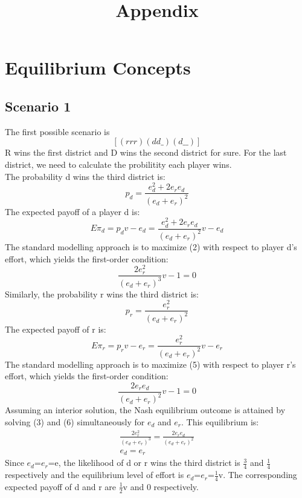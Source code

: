 \documentclass[a4paper,12pt]{article}
\author{}
\title{Appendix}
\date{} %
\begin{document}
\maketitle

\section{Equilibrium Concepts}

\subsection{Scenario 1}

The first possible scenario is $$[(rrr)(dd\_)(d\_\_)]$$
R wins the first district and D wins the second district for sure. For the last district, we need to calculate the probilitity each player wins.
\\The probability d wins the third district is: 
\begin{equation}
p_d = \frac{e_d^2+2e_re_d}{(e_d+e_r)^2}
\end{equation}
The expected payoff of a player d is:
\begin{equation}
E\pi_d= p_dv-e_d = \frac{e_d^2+2e_re_d}{(e_d+e_r)^2} v-e_d
\end{equation}
The standard modelling approach is to maximize (2) with respect to player d's effort, which yields the first-order condition: 
\begin{equation}
\frac{2e_r^2}{(e_d+e_r)^3}v-1=0
\end{equation}
Similarly, the probability r wins the third district is:
\begin{equation} 
p_r =\frac{e_r^2}{(e_d+e_r)^2}
\end{equation}
The expected payoff of r is: 
\begin{equation} 
E\pi_r= p_rv-e_r= \frac{e_r^2}{(e_d+e_r)^2} v-e_r
\end{equation}
The standard modelling approach is to maximize (5) with respect to player r's effort, which yields the first-order condition: 
\begin{equation} 
\frac{2e_re_d}{(e_d+e_r)^2}v-1=0
\end{equation}
Assuming an interior solution, the Nash equilibrium outcome is attained by solving (3) and (6) simultaneously for $e_d$ and $e_r$. This equilibrium is: 
\begin{eqnarray} 
\frac{2e_r^2}{(e_d+e_r)^3} = \frac{2e_re_d}{(e_d+e_r)^2} \\
e_d=e_r
\end{eqnarray}
Since $e_d$=$e_r$=e, the likelihood of d or r wins the third district is $\frac{3}{4}$ and $\frac{1}{4}$ respectively and the equilibrium level of effort is $e_d$=$e_r$=$\frac{1}{4}$v.
The corresponding expected payoff of d and r are $\frac{1}{2}$v and 0 respectively. 
\end{document}
